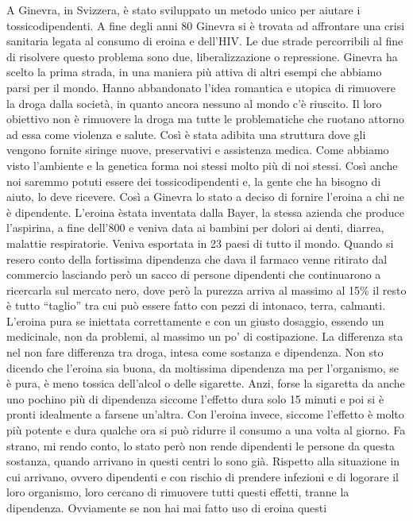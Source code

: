 \documentclass[12pt]{book} %
\begin{document}
A Ginevra, in Svizzera, è stato sviluppato un metodo unico per aiutare i tossicodipendenti. A fine degli anni 80 Ginevra
si è trovata ad affrontare una crisi sanitaria legata al consumo di eroina e dell'HIV. Le due
strade percorribili al fine di risolvere questo problema sono due, liberalizzazione o repressione. Ginevra ha scelto la
prima strada, in una maniera più attiva di altri esempi che abbiamo parsi per il mondo. Hanno abbandonato
l'idea romantica e utopica di rimuovere la droga dalla società, in quanto ancora nessuno al mondo
c'è riuscito. Il loro obiettivo non è rimuovere la droga ma tutte le problematiche che ruotano
attorno ad essa come violenza e salute. Così è stata adibita una struttura dove gli vengono fornite siringe nuove,
preservativi e assistenza medica. Come abbiamo visto l'ambiente e la genetica forma noi stessi
molto più di noi stessi. Così anche noi saremmo potuti essere dei tossicodipendenti e, la gente che ha bisogno di
aiuto, lo deve ricevere. Così a Ginevra lo stato a deciso di fornire l'eroina a chi ne è
dipendente. L'eroina èstata inventata dalla Bayer, la stessa azienda che produce
l'aspirina, a fine dell'800 e veniva data ai bambini per dolori ai denti,
diarrea, malattie respiratorie. Veniva esportata in 23 paesi di tutto il mondo. Quando si resero conto della fortissima
dipendenza che dava il farmaco venne ritirato dal commercio lasciando però un sacco di persone dipendenti che
continuarono a ricercarla sul mercato nero, dove però la purezza arriva al massimo al 15\% il resto è tutto “taglio”
tra cui può essere fatto con pezzi di intonaco, terra, calmanti. L'eroina pura se iniettata
correttamente e con un giusto dosaggio, essendo un medicinale, non da problemi, al massimo un po' di costipazione. La
differenza sta nel non fare differenza tra droga, intesa come sostanza e dipendenza. Non sto dicendo che
l'eroina sia buona, da moltissima dipendenza ma per l'organismo, se è pura, è
meno tossica dell'alcol o delle sigarette. Anzi, forse la sigaretta da anche uno pochino più di
dipendenza siccome l'effetto dura solo 15 minuti e poi si è pronti idealmente a farsene
un'altra. Con l'eroina invece, siccome l'effetto è molto
più potente e dura qualche ora si può ridurre il consumo a una volta al giorno. Fa strano, mi rendo conto, lo stato
però non rende dipendenti le persone da questa sostanza, quando arrivano in questi centri lo sono già. Rispetto alla
situazione in cui arrivano, ovvero dipendenti e con rischio di prendere infezioni e di logorare il loro organismo, loro
cercano di rimuovere tutti questi effetti, tranne la dipendenza. Ovviamente se non hai mai fatto uso di eroina questi
\end{document}
